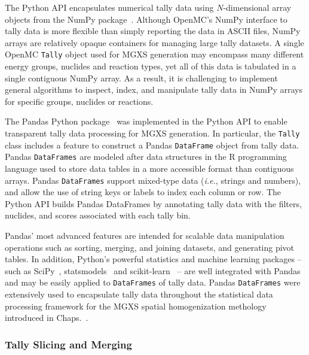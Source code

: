 The Python API encapsulates numerical tally data using $N$-dimensional array objects from the NumPy package~\cite{walt2011numpy}. Although OpenMC's NumPy interface to tally data is more flexible than simply reporting the data in \ac{ASCII} files, NumPy arrays are relatively opaque containers for managing large tally datasets. A single OpenMC \texttt{Tally} object used for \ac{MGXS} generation may encompass many different energy groups, nuclides and reaction types, yet all of this data is tabulated in a single contiguous NumPy array. As a result, it is challenging to implement general algorithms to inspect, index, and manipulate tally data in NumPy arrays for specific groups, nuclides or reactions.

The Pandas Python package~\cite{mckinney2010pandas} was implemented in the Python \ac{API} to enable transparent tally data processing for \ac{MGXS} generation. In particular, the \texttt{Tally} class includes a feature to construct a Pandas 
\texttt{DataFrame} object from tally data. Pandas \texttt{DataFrames} are modeled after data structures in the \textsf{R} programming language used to store data tables in a more accessible format than contiguous arrays. Pandas \texttt{DataFrames} support mixed-type data (\textit{i.e.}, strings and numbers), and allow the use of string keys or labels to index each column or row. The Python \ac{API} builds Pandas DataFrames by annotating tally data with the filters, nuclides, and scores associated with each tally bin. 

Pandas' most advanced features are intended for scalable data manipulation operations such as sorting, merging, and joining datasets, and generating pivot tables. In addition, Python's powerful statistics and machine learning packages -- such as SciPy~\cite{jones2011scipy}, statsmodels~\cite{seabold2010statsmodels} and scikit-learn~\cite{pedregosa2011sklearn} -- are well integrated with Pandas and may be easily applied to \texttt{DataFrames} of tally data. Pandas \texttt{DataFrames} were extensively used to encapsulate tally data throughout the statistical data processing framework for the \ac{MGXS} spatial homogenization methology introduced in Chaps.~.

\subsubsection{Tally Slicing and Merging}
\label{subsubsec:chap4-tally-slice-merge}

